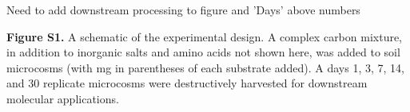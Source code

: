 Need to add downstream processing to figure and 'Days' above numbers 

\textbf{Figure S1.} A schematic of the experimental design.  A complex carbon mixture, in addition to inorganic salts and amino acids not shown here, was added to soil microcosms (with mg in parentheses of each substrate added). A days 1, 3, 7, 14, and 30 replicate microcosms were destructively harvested for downstream molecular applications.   
